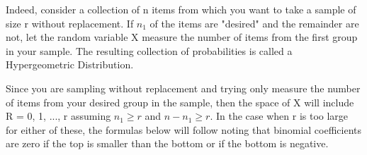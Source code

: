 \documentclass[10pt,]{book}
\theoremstyle{plain}
\theoremstyle{definition}
\theoremstyle{definition}
\theoremstyle{definition}
\numberwithin{equation}{section}
\begin{document}
	Indeed, consider a collection of n items from which you want to take a sample of size r without replacement. If \(n_1\) of the items are "desired" and the remainder are not, let the random variable X measure the number of items from the first group in your sample. The resulting collection of probabilities is called a Hypergeometric Distribution.
\par

	Since you are sampling without replacement and trying only measure the number of items from your desired group in the sample, then the space of X will include R = {0, 1, ..., r} assuming \(n_1 \ge r\) and \(n-n_1 \ge r\). In the case when r is too large for either of these, the formulas below will follow noting that binomial coefficients are zero if the top is smaller than the bottom or if the bottom is negative.
\par
\end{document}

